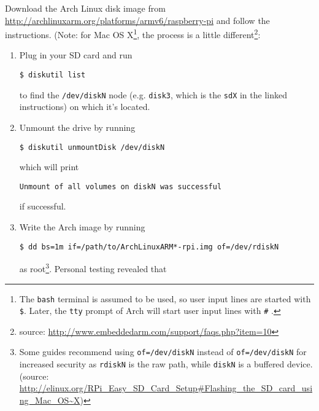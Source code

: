 \documentclass[12pt,letterpaper]{article}
\begin{document}
Download the Arch Linux disk image from \url{http://archlinuxarm.org/platforms/armv6/raspberry-pi} and follow the instructions.
(Note: for Mac OS X\footnote{The \lstinline{bash} terminal is assumed to be used, so user input lines are started with \lstinline{$}.  Later, the \lstinline{tty} prompt of Arch will start user input lines with \lstinline{#}%
.}, the process is a little different\footnote{source: \url{http://www.embeddedarm.com/support/faqs.php?item=10}}:

\begin{enumerate}
\item Plug in your SD card and run

\begin{lstlisting}
$ diskutil list
\end{lstlisting}
to find the \lstinline{/dev/diskN} node (e.g. \lstinline{disk3}, which is the \lstinline{sdX} in the linked instructions) on which it's located.

\item Unmount the drive by running

\begin{lstlisting}
$ diskutil unmountDisk /dev/diskN
\end{lstlisting}

which will print

\begin{lstlisting}
Unmount of all volumes on diskN was successful
\end{lstlisting}

if successful.

\item Write the Arch image by running

\begin{lstlisting}
$ dd bs=1m if=/path/to/ArchLinuxARM*-rpi.img of=/dev/rdiskN
\end{lstlisting}
as root\footnote{Some guides recommend using \lstinline{of=/dev/diskN} instead of \lstinline{of=/dev/diskN} for increased security as \lstinline{rdiskN} is the raw path, while \lstinline{diskN} is a buffered device. (source: %
\url{http://elinux.org/RPi_Easy_SD_Card_Setup\#Flashing_the_SD_card_using_Mac_OS~X}) }. %
Personal testing revealed that


\end{enumerate}
\end{document}

